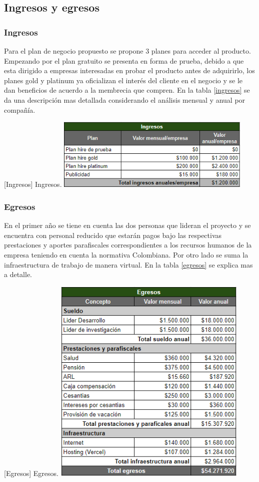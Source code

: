 \subsection{Ingresos y egresos}

\subsubsection{Ingresos}
Para el plan de negocio propuesto se propone 3 planes para acceder al producto. Empezando por el plan gratuito se presenta en forma de prueba, debido a que esta dirigido a empresas interesadas en probar el producto antes de adquirirlo, los planes gold y platinum ya oficializan el interés del cliente en el negocio y se le dan beneficios de acuerdo a la membrecia que compren. En la tabla \ref{ingresos} se da una descripción mas detallada considerando el análisis mensual y anual por compañía.

\vspace{2mm}
\begin{minipage}{0.9\textwidth}
\centering
{}[{Ingresos}]{ Ingresos. }
\label{ingresos}
\includegraphics[width=0.7\textwidth]{Images/ingresos.png}
\end{minipage}


\subsubsection{Egresos}
En el primer año se tiene en cuenta las dos personas que lideran el proyecto y se encuentra con personal reducido que estarán pagos bajo las respectivas prestaciones y aportes parafiscales correspondientes a los recursos humanos de la empresa teniendo en cuenta la normativa Colombiana. Por otro lado se suma la infraestructura de trabajo de manera virtual. En la tabla \ref{egresos} se explica mas a detalle.

\vspace{2mm}
\begin{minipage}{0.9\textwidth}
\centering
{}[{Egresos}]{ Egresos. }
\label{egresos}
\includegraphics[width=0.7\textwidth]{Images/egresos.png}
\end{minipage}
